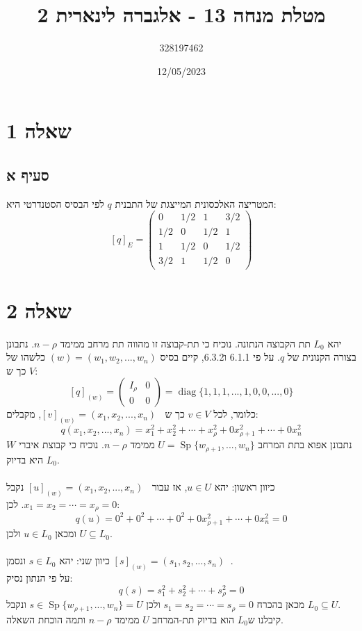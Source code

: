\documentclass{article}
\title{מטלת מנחה 13 - אלגברה לינארית 2}
\author{328197462}
\date{12/05/2023}
\DeclareMathOperator{\tra}{^t}
\DeclareMathOperator{\Sp}{Sp}
\DeclareMathOperator{\diag}{diag}
\begin{document}
\maketitle

\section*{שאלה 1}
\subsection*{סעיף א}

המטריצה האלכסונית המייצגת של התבנית $q$ לפי הבסיס הסטנדרטי היא:
\[
    [q]_E = \begin{pmatrix}
        0   & 1/2 & 1   & 3/2 \\
        1/2 & 0   & 1/2 & 1   \\
        1   & 1/2 & 0   & 1/2 \\
        3/2 & 1   & 1/2 & 0
    \end{pmatrix}
\]

\pagebreak

\section*{שאלה 2}

יהא $L_0$ תת הקבוצה הנתונה. נוכיח כי תת-קבוצה זו מהווה תת מרחב ממימד $n-\rho$.
נתבונן בצורה הקנונית של $q$. על פי 6.1.1 ו6.3.2, קיים בסיס $(w)=(w_1, w_2, ..., w_n)$ כלשהו של $V$ כך ש:
\[
    [q]_{(w)} = \begin{pmatrix}
        I_{\rho} & 0 \\
        0        & 0
    \end{pmatrix} = \diag\{1, 1, 1, ..., 1, 0, 0, ..., 0\}
\]
כלומר, לכל $v\in V$ כך ש $[v]_{(w)}=(x_1, x_2, ..., x_n)\tra$, מקבלים:
\[
    q(x_1, x_2, ..., x_n) = x_1^2+x_2^2+\cdots+x_\rho^2+0x_{\rho+1}^2+\cdots+0x_n^2
\]
נתבונן אפוא בתת המרחב $U=\Sp\{ w_{\rho+1}, ..., w_n \}$ ממימד $n-\rho$. נוכיח כי קבוצת איברי $W$ היא בדיוק $L_0$.\\\\
כיוון ראשון: יהא $u\in U$, אז עבור $[u]_{(w)}=(x_1, x_2, ..., x_n)\tra$ נקבל $x_1=x_2=\cdots=x_\rho=0$. לכן:
\[
    q(u)=0^2+0^2+\cdots+0^2+0x_{\rho+1}^2+\cdots+0x_n^2=0
\]
ומכאן $u\in L_0$ ולכן $U\subseteq L_0$.\\\\
כיוון שני: יהא $s\in L_0$ ונסמן $[s]_{(w)}=(s_1, s_2, ..., s_n) \tra$. \\
על פי הנתון נסיק:
\[
    q(s)=s_1^2+s_2^2+\cdots+s_\rho^2=0
\]
מכאן בהכרח $s_1=s_2=\cdots=s_\rho=0$ ולכן $s\in \Sp\{  w_{\rho+1}, ..., w_n \}=U$ ונקבל $L_0\subseteq U$. \\
קיבלנו ש$L_0$ הוא בדיוק תת-המרחב $U$ ממימד $n-\rho$ ותמה הוכחת השאלה.
\end{document}

